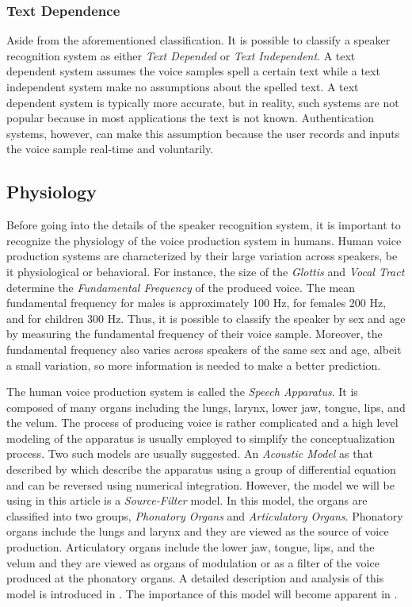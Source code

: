 \documentclass[twocolumn]{article}
\begin{document}
\subsubsection{Text Dependence}

Aside from the aforementioned classification. It is possible to classify a
speaker recognition system as either \emph{Text Depended} or \emph{Text
Independent}. A text dependent system assumes the voice samples spell a certain
text while a text independent system make no assumptions about the spelled
text. A text dependent system is typically more accurate, but in reality, such
systems are not popular because in most applications the text is not known.
Authentication systems, however, can make this assumption because the user
records and inputs the voice sample real-time and voluntarily.

\subsection{Physiology}

Before going into the details of the speaker recognition system, it is
important to recognize the physiology of the voice production system in humans.
Human voice production systems are characterized by their large variation
across speakers, be it physiological or behavioral. For instance, the size of
the \emph{Glottis} and \emph{Vocal Tract} determine the \emph{Fundamental
Frequency} of the produced voice. The mean fundamental frequency for males is
approximately 100 Hz, for females 200 Hz, and for children 300 Hz. Thus, it is
possible to classify the speaker by sex and age by measuring the fundamental
frequency of their voice sample. Moreover, the fundamental frequency also
varies across speakers of the same sex and age, albeit a small variation, so
more information is needed to make a better prediction.

The human voice production system is called the \emph{Speech Apparatus}. It is
composed of many organs including the lungs, larynx, lower jaw, tongue, lips,
and the velum. The process of producing voice is rather complicated and a high
level modeling of the apparatus is usually employed to simplify the
conceptualization process. Two such models are usually suggested. An
\emph{Acoustic Model} as that described by \autocite{Maeda1982} which describe
the apparatus using a group of differential equation and can be reversed using
numerical integration. However, the model we will be using in this article is a
\emph{Source-Filter} model. In this model, the organs are classified into two
groups, \emph{Phonatory Organs} and \emph{Articulatory Organs}. Phonatory
organs include the lungs and larynx and they are viewed as the source of voice
production. Articulatory organs include the lower jaw, tongue, lips, and the
velum and they are viewed as organs of modulation or as a filter of the voice
produced at the phonatory organs. A detailed description and analysis of this
model is introduced in \autocite{Degottex2010}. The importance of this model
will become apparent in .
\end{document}
